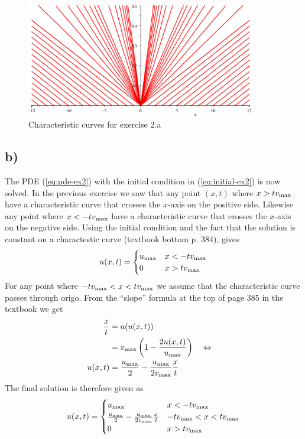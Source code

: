     \begin{figure}[!ht]
        \centering
        \includegraphics[width=100mm]{media/characteristics-ex2.pdf}
        \caption{Characteristic curves for exercise 2.a}
        \label{fig:chars-q2}
    \end{figure}

    \subsection*{b)}
    The PDE (\ref{eq:pde-ex2}) with the initial condition in (\ref{eq:initial-ex2}) is now solved. In the previous exercise we saw that any point $(x,t)$ where $x>tv_{\text{max}}$ have a characteristic curve that crosses the $x$-axis on the positive side. Likewise any point where $x<-tv_{\text{max}}$ have a characteristic curve that crosses the $x$-axis on the negative side. Using the initial condition and the fact that the solution is constant on a charactestic curve (textbook bottom p. 384), gives
    \begin{equation*}
        u(x,t) = \begin{cases}
            u_{\text{max}} & x < -tv_{\text{max}} \\
            0 & x>tv_{\text{max}}
        \end{cases}
    \end{equation*}
    For any point where $-tv_{\text{max}}<x<tv_{\text{max}}$ we assume that the characteristic curve passes through origo. From the ``slope'' formula at the top of page 385 in the textbook we get
    \begin{align*}
        \frac{x}{t} &= a(u(x,t)) \\
            &= v_{\text{max}}\left(1 - \frac{2u(x,t)}{u_{\text{max}}}\right) \quad\Leftrightarrow\quad \\
        u(x,t) &= \frac{u_{\text{max}}}{2} - \frac{u_{\text{max}}}{2v_{\text{max}}}\frac{x}{t}
    \end{align*}
    The final solution is therefore given as
    \begin{equation*}
        u(x,t) = \begin{cases}
            u_{\text{max}} & x < -tv_{\text{max}} \\
            \frac{u_{\text{max}}}{2} - \frac{u_{\text{max}}}{2v_{\text{max}}}\frac{x}{t} & -tv_{\text{max}}<x<tv_{\text{max}} \\
            0 & x>tv_{\text{max}}
        \end{cases}
    \end{equation*}

